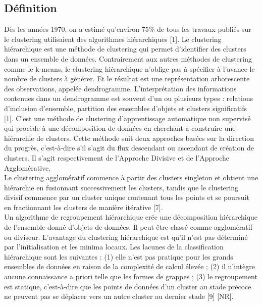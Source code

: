 \subsection{Définition}
Dès les années 1970, on a estimé qu'environ 75\% de tous les travaux publiés sur le clustering utilisaient des algorithmes hiérarchiques [1]. Le clustering hiérarchique est une méthode de clustering qui permet d’identifier des clusters dans un ensemble de données. Contrairement aux autres méthodes de clustering comme le k-means, le clustering hiérarchique n’oblige pas à spécifier à l’avance le nombre de clusters à générer. Et le résultat est une représentation arborescente des observations, appelée dendrogramme. L'interprétation des informations contenues dans un dendrogramme est souvent d'un ou plusieurs types : relations d'inclusion d'ensemble, partition des ensembles d'objets et clusters significatifs [1]. C’est une méthode de clustering d’apprentissage automatique non supervisé qui procède à une décomposition de données en cherchant à construire une hiérarchie de clusters. Cette méthode suit deux approches basées sur la direction du progrès, c'est-à-dire s'il s'agit du flux descendant ou ascendant de création de clusters. Il s'agit respectivement de l'Approche Divisive et de l'Approche Agglomérative. \\
Le clustering agglomératif commence à partir des clusters singleton et obtient une hiérarchie en fusionnant successivement les clusters, tandis que le clustering divisif commence par un cluster unique contenant tous les points et se poursuit en fractionnant les clusters de manière itérative [7]. \\
Un algorithme de regroupement hiérarchique crée une décomposition hiérarchique de l'ensemble donné d'objets de données. Il peut être classé comme agglomératif ou diviseur. L'avantage du clustering hiérarchique est qu'il n'est pas déterminé par l'initialisation et les minima locaux. Les lacunes de la classification hiérarchique sont les suivantes : (1) elle n'est pas pratique pour les grands ensembles de données en raison de la complexité de calcul élevée ; (2) il n'intègre aucune connaissance a priori telle que les formes de grappes ; (3) le regroupement est statique, c'est-à-dire que les points de données d'un cluster au stade précoce ne peuvent pas se déplacer vers un autre cluster au dernier stade [9] [NR].

